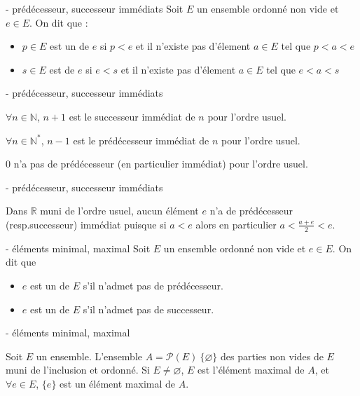 



\begin{definition}{6.16}{- prédécesseur, successeur immédiats}
Soit $E$ un ensemble ordonné non vide et $e \in E$. On dit que :
    \begin{itemize}
        \item $p \in E$ est un  de $e$ si $p<e$ et il n'existe pas d'élement $a\in E$ tel que $p<a<e$
        \item $s \in E$ est  de $e$ si $e<s$ et il n'existe pas d'élement $a\in E$ tel que $e<a<s$
    \end{itemize}
\end{definition}

\begin{exemple}{6.17}{- prédécesseur, successeur immédiats}
    \item $\forall n \in \mathbb{N}$, $n+1$ est le successeur immédiat de $n$ pour l'ordre usuel.
    \item $\forall n \in \mathbb{N}^*$, $n-1$ est le prédécesseur immédiat de $n$ pour l'ordre usuel.
    \item $0$ n'a pas de prédécesseur (en particulier immédiat) pour l'ordre usuel.
\end{exemple}


\begin{exemple}{6.18}{- prédécesseur, successeur immédiats}
    \item Dans $\mathbb{R}$ muni de l'ordre usuel, aucun élément $e$ n'a de prédécesseur (resp.successeur) immédiat puisque si $a<e$ alors en particulier $a<\frac{a+e}{2}<e$.
\end{exemple}


\begin{definition}{6.19}{- éléments minimal, maximal}
    Soit $E$ un ensemble ordonné non vide et $e \in E$. On dit que \begin{itemize}
        \item $e$ est un  de $E$ s'il n'admet pas de prédécesseur.
        \item $e$ est un  de $E$ s'il n'admet pas de successeur.
    \end{itemize}

\end{definition}

\begin{exemple}{6.20}{- éléments minimal, maximal}
    \item Soit $E$ un ensemble. L'ensemble $A = \mathcal{P}(E) \ \{\varnothing\}$ des parties non vides de $E$ muni de l'inclusion et ordonné. Si $E \neq \varnothing$, $E$ est l'élément maximal de $A$, et $\forall e \in E$, $\{e\}$ est un élément maximal de $A$.
\end{exemple}

